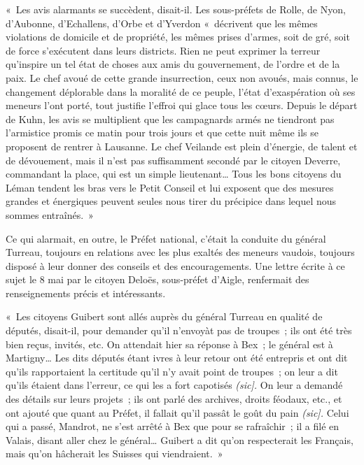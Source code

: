 \documentclass[french,twoside]{book} %
\newenvironment{quoteblock}%
  {\begin{quoting}}
  {\end{quoting}}
\newenvironment{quotebar}{%
    \def\FrameCommand{{\color{rubric!10!}\vrule width 0.5em} \hspace{0.9em}}%
    \def\OuterFrameSep{\itemsep} %
    \MakeFramed {\advance\hsize-\width \FrameRestore}
  }%
  {%
    \endMakeFramed
  }
\renewenvironment{quoteblock}%
  {%
    \savenotes
    \setstretch{0.9}
    \normalfont
    \begin{quotebar}
  }
  {%
    \end{quotebar}
    \spewnotes
  }
\begin{document}
\begin{quoteblock}
 \noindent « Les avis alarmants se succèdent, disait-il. Les sous-préfets de Rolle, de Nyon, d’Aubonne, d’Echallens, d’Orbe et d’Yverdon « décrivent que les mêmes violations de domicile et de propriété, les mêmes prises d’armes, soit de gré, soit de force s’exécutent dans leurs districts. Rien ne peut exprimer la terreur qu’inspire un tel état de choses aux amis du gouvernement, de l’ordre et de la paix. Le chef avoué de cette grande insurrection, ceux non avoués, mais connus, le changement déplorable dans la moralité de ce peuple, l’état d’exaspération où ses meneurs l’ont porté, tout justifie l’effroi qui glace tous les cœurs. Depuis le départ de Kuhn, les avis se multiplient que les campagnards armés ne tiendront pas l’armistice promis ce matin pour trois jours et que cette nuit même ils se proposent de rentrer à Lausanne. Le chef Veilande est plein d’énergie, de talent et de dévouement, mais il n’est pas suffisamment secondé par le citoyen Deverre, commandant la place, qui est un simple lieutenant… Tous les bons citoyens du Léman tendent les bras vers le Petit Conseil et lui exposent que des mesures grandes et énergiques peuvent seules nous tirer du précipice dans lequel nous sommes entraînés. »
 \end{quoteblock}

\noindent Ce qui alarmait, en outre, le Préfet national, c’était la conduite du général Turreau, toujours en relations avec les plus exaltés des meneurs vaudois, toujours disposé à leur donner des conseils et des encouragements. Une lettre écrite à ce sujet le 8 mai par le citoyen Deloës, sous-préfet d’Aigle, renfermait des renseignements précis et intéressants.\par

\begin{quoteblock}
 \noindent « Les citoyens Guibert sont allés auprès du général Turreau en qualité de députés, disait-il, pour demander qu’il n’envoyàt pas de troupes ; ils ont été très bien reçus, invités, etc. On attendait hier sa réponse à Bex ; le général est à Martigny… Les dits députés étant ivres à leur retour ont été entrepris et ont dit qu’ils rapportaient la certitude qu’il n’y avait point de troupes ; on leur a dit qu’ils étaient dans l’erreur, ce qui les a fort capotisés \emph{(sic].} On leur a demandé des détails sur leurs projets ; ils ont parlé des archives, droits féodaux, etc., et ont ajouté que quant au Préfet, il fallait qu’il passât le goût du pain \emph{(sic].} Celui qui a passé, Mandrot, ne s’est arrêté à Bex que pour se rafraîchir ; il a filé en Valais, disant aller chez le général… Guibert a dit qu’on respecterait les Français, mais qu’on hâcherait les Suisses qui viendraient. »
 \end{quoteblock}
\end{document}
